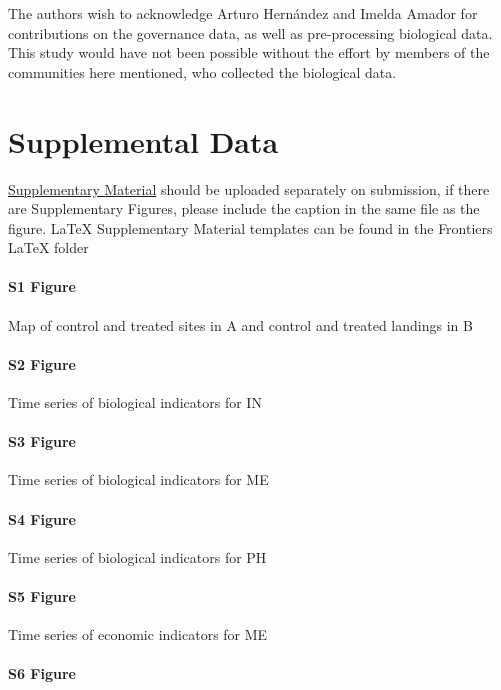 \documentclass{frontiersSCNS}
\begin{document}
The authors wish to acknowledge Arturo Hernández and Imelda Amador for
contributions on the governance data, as well as pre-processing
biological data. This study would have not been possible without the
effort by members of the communities here mentioned, who collected the
biological data.

\section*{Supplemental Data}

\href{http://home.frontiersin.org/about/author-guidelines#SupplementaryMaterial}{Supplementary Material}
should be uploaded separately on submission, if there are Supplementary
Figures, please include the caption in the same file as the figure.
LaTeX Supplementary Material templates can be found in the Frontiers
LaTeX folder

\paragraph*{S1 Figure}
\label{S1_Figure}

Map of control and treated sites in A and control and treated landings
in B

\paragraph*{S2 Figure}
\label{S2_Figure}

Time series of biological indicators for IN

\paragraph*{S3 Figure}
\label{S3_Figure}

Time series of biological indicators for ME

\paragraph*{S4 Figure}
\label{S4_Figure}

Time series of biological indicators for PH

\paragraph*{S5 Figure}
\label{S5_Figure}

Time series of economic indicators for ME

\paragraph*{S6 Figure}
\label{S6_Figure}
\end{document}
